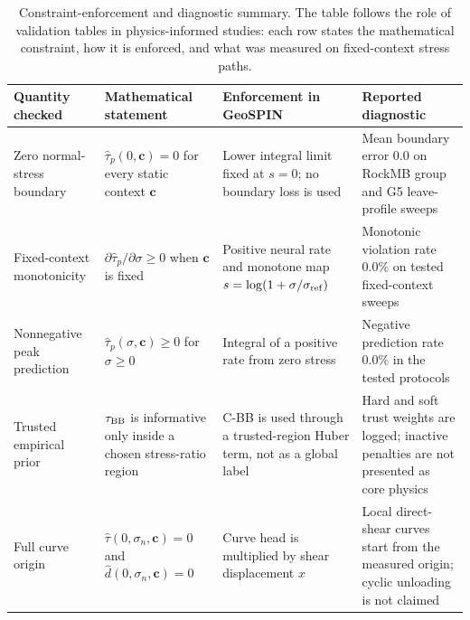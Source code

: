 \begin{table}[t]
\centering
\caption{Constraint-enforcement and diagnostic summary. The table follows the role of validation tables in physics-informed studies: each row states the mathematical constraint, how it is enforced, and what was measured on fixed-context stress paths.}
\label{tab:physics_checks}
\small
\setlength{\tabcolsep}{3pt}
\begin{tabular}{p{}p{}p{}p{}}
\toprule
Quantity checked & Mathematical statement & Enforcement in GeoSPIN & Reported diagnostic \\
\midrule
Zero normal-stress boundary & $\widehat{\tau}_p(0,\mathbf{c})=0$ for every static context $\mathbf{c}$ & Lower integral limit fixed at $s=0$; no boundary loss is used & Mean boundary error $0.0$ on RockMB group and G5 leave-profile sweeps \\
Fixed-context monotonicity & $\partial\widehat{\tau}_p/\partial\sigma\geq0$ when $\mathbf{c}$ is fixed & Positive neural rate and monotone map $s=\log(1+\sigma/\sigma_{\rm ref})$ & Monotonic violation rate $0.0\%$ on tested fixed-context sweeps \\
Nonnegative peak prediction & $\widehat{\tau}_p(\sigma,\mathbf{c})\geq0$ for $\sigma\geq0$ & Integral of a positive rate from zero stress & Negative prediction rate $0.0\%$ in the tested protocols \\
Trusted empirical prior & $\tau_{\rm BB}$ is informative only inside a chosen stress-ratio region & C-BB is used through a trusted-region Huber term, not as a global label & Hard and soft trust weights are logged; inactive penalties are not presented as core physics \\
Full curve origin & $\widehat{\tau}(0,\sigma_n,\mathbf{c})=0$ and $\widehat d(0,\sigma_n,\mathbf{c})=0$ & Curve head is multiplied by shear displacement $x$ & Local direct-shear curves start from the measured origin; cyclic unloading is not claimed \\
\bottomrule
\end{tabular}
\end{table}
